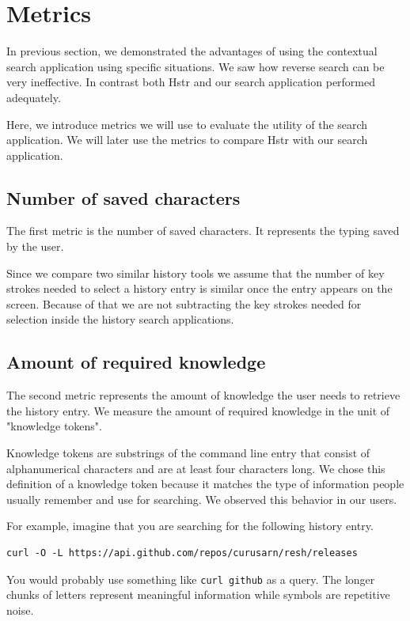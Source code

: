 \section{Metrics}

In previous section, we demonstrated the advantages of using the contextual search application using specific situations. We saw how reverse search can be very ineffective. In contrast both Hstr and our search application performed adequately.

Here, we introduce metrics we will use to evaluate the utility of the search application. We will later use the metrics to compare Hstr with our search application. 

\subsection{Number of saved characters}

The first metric is the number of saved characters. It represents the typing saved by the user.

Since we compare two similar history tools we assume that the number of key strokes needed to select a history entry is similar once the entry appears on the screen. Because of that we are not subtracting the key strokes needed for selection inside the history search applications.

\subsection{Amount of required knowledge}

The second metric represents the amount of knowledge the user needs to retrieve the history entry. We measure the amount of required knowledge in the unit of "knowledge tokens".

Knowledge tokens are substrings of the command line entry that consist of alphanumerical characters and are at least four characters long. We chose this definition of a knowledge token because it matches the type of information people usually remember and use for searching. We observed this behavior in our users. 

For example, imagine that you are searching for the following history entry.

\begin{verbatim}
curl -O -L https://api.github.com/repos/curusarn/resh/releases  
\end{verbatim}

You would probably use something like \verb|curl github| as a query. The longer chunks of letters represent meaningful information while symbols are repetitive noise.

